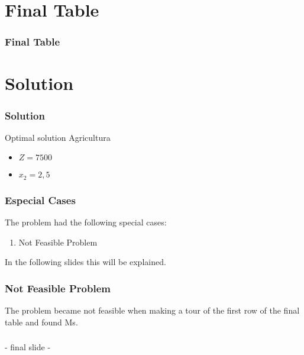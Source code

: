 \documentclass{beamer}
\begin{document}
\section{Final Table} 
 
\begin{frame}  
\frametitle{Final Table} 
\begin{table}[H] 
\begin{center} 
\caption{Final Table.} 
\end{center} 
\end{table} 
\end{frame} 
 

\section{Solution} 
\begin{frame} 
\frametitle{Solution} 
\begin{exampleblock}{Optimal solution} 
{\scriptsize Agricultura
} 
\begin{itemize} 
\item $Z = 7500$ 
\item $x_{2} = 2,5$ 
\end{itemize} 
\end{exampleblock} 
\end{frame} 


\begin{frame} 
\frametitle{Especial Cases} 
\begin{exampleblock}{} 
The problem had the following special cases: 
\begin{enumerate} 
\item Not Feasible Problem  
\end{enumerate} 
\end{exampleblock} 
In the following slides this will be explained. 
\end{frame} 


\begin{frame} 
\frametitle{Not Feasible Problem} 
The problem became not feasible when making a tour of the first row of the final table and found Ms.
\end{frame} 

\begin{frame}\frametitle{}\begin{center}{\Huge - final slide -}\end{center}\end{frame} 
\end{document}
